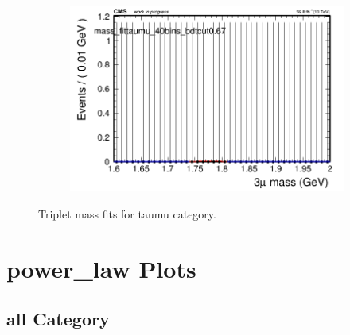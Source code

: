 \begin{figure}[H]
\begin{subfigure}{0.2\textwidth}
        \includegraphics[width=\textwidth]{unfixed_exp/plots/taumu/massfit_taumu_40bins_bdtcut0.67.png}
        \caption{}
    \end{subfigure}
    \caption{Triplet mass fits for taumu category.}
    \label{fig:unfixedexptaumu}
\end{figure}

\section{power\_law Plots}

\subsection{all Category}
\label{sec:powerlawall}


